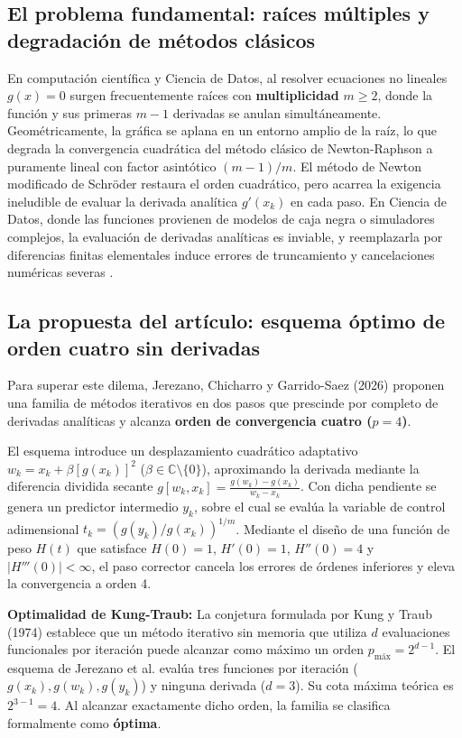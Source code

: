 \documentclass[10pt, a4paper]{article}
\begin{document}
\subsection{El problema fundamental: raíces múltiples y degradación de métodos clásicos}
En computación científica y Ciencia de Datos, al resolver ecuaciones no lineales $g(x) = 0$ surgen frecuentemente raíces con \textbf{multiplicidad} $m \ge 2$, donde la función y sus primeras $m-1$ derivadas se anulan simultáneamente. Geométricamente, la gráfica se aplana en un entorno amplio de la raíz, lo que degrada la convergencia cuadrática del método clásico de Newton-Raphson a puramente lineal con factor asintótico $(m-1)/m$. El método de Newton modificado de Schröder restaura el orden cuadrático, pero acarrea la exigencia ineludible de evaluar la derivada analítica $g'(x_k)$ en cada paso. En Ciencia de Datos, donde las funciones provienen de modelos de caja negra o simuladores complejos, la evaluación de derivadas analíticas es inviable, y reemplazarla por diferencias finitas elementales induce errores de truncamiento y cancelaciones numéricas severas \cite{Turner2018}.

\subsection{La propuesta del artículo: esquema óptimo de orden cuatro sin derivadas}
Para superar este dilema, Jerezano, Chicharro y Garrido-Saez (2026) \cite{Jerezano2026} proponen una familia de métodos iterativos en dos pasos que prescinde por completo de derivadas analíticas y alcanza \textbf{orden de convergencia cuatro ($p=4$)}. 

El esquema introduce un desplazamiento cuadrático adaptativo $w_k = x_k + \beta [g(x_k)]^2$ ($\beta \in \mathbb{C} \setminus \{0\}$), aproximando la derivada mediante la diferencia dividida secante $g[w_k, x_k] = \frac{g(w_k)-g(x_k)}{w_k-x_k}$. Con dicha pendiente se genera un predictor intermedio $y_k$, sobre el cual se evalúa la variable de control adimensional $t_k = (g(y_k)/g(x_k))^{1/m}$. Mediante el diseño de una función de peso $H(t)$ que satisface $H(0)=1$, $H'(0)=1$, $H''(0)=4$ y $|H'''(0)| < \infty$, el paso corrector cancela los errores de órdenes inferiores y eleva la convergencia a orden 4.

\textbf{Optimalidad de Kung-Traub:}
La conjetura formulada por Kung y Traub (1974) \cite{KungTraub1974} establece que un método iterativo sin memoria que utiliza $d$ evaluaciones funcionales por iteración puede alcanzar como máximo un orden $p_{\text{máx}} = 2^{d-1}$. El esquema de Jerezano et al. evalúa tres funciones por iteración ($g(x_k), g(w_k), g(y_k)$) y ninguna derivada ($d=3$). Su cota máxima teórica es $2^{3-1} = 4$. Al alcanzar exactamente dicho orden, la familia se clasifica formalmente como \textbf{óptima}.
\end{document}
